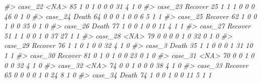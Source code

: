 \documentclass[]{book}
\newenvironment{Shaded}{\begin{snugshade}}{\end{snugshade}}
\newcommand{\CommentTok}[1]{\textcolor[rgb]{0.56,0.35,0.01}{\textit{#1}}}
\begin{document}
\begin{Shaded}
\begin{Highlighting}[]
\CommentTok{#> case_22     <NA>  85        1        0                1                 0                 0              0                    31                      4           1             0}
\CommentTok{#> case_23  Recover  25        1        1                1                 0                 0              0                    46                      0           1             0}
\CommentTok{#> case_24    Death  64        0        0                0                 1                 0              0                     6                      5           1             1}
\CommentTok{#> case_25  Recover  62        1        0                0                 1                 0              0                    35                      0           1             0}
\CommentTok{#> case_26    Death  77        1        0                0                 1                 0              0                    11                      4           1             1}
\CommentTok{#> case_27  Recover  51        1        1                0                 0                 1              0                    37                     27           1             1}
\CommentTok{#> case_28     <NA>  79        0        0                0                 0                 1              0                    32                      0           1             0}
\CommentTok{#> case_29  Recover  76        1        1                0                 1                 0              0                    32                      4           1             0}
\CommentTok{#> case_3     Death  35        1        1                0                 0                 0              1                    31                     10           1             1}
\CommentTok{#> case_30  Recover  81        0        1                0                 1                 0              0                    23                      0           1             0}
\CommentTok{#> case_31     <NA>  70        0        0                1                 0                 0              0                    32                      4           1             0}
\CommentTok{#> case_32     <NA>  74        0        0                1                 0                 0              0                    38                      4           1             0}
\CommentTok{#> case_33  Recover  65        0        0                0                 0                 1              0                    24                      8           1             0}
\CommentTok{#> case_34    Death  74        1        0                0                 1                 0              0                    11                      5           1             1}

\end{Highlighting}
\end{Shaded}
\end{document}
